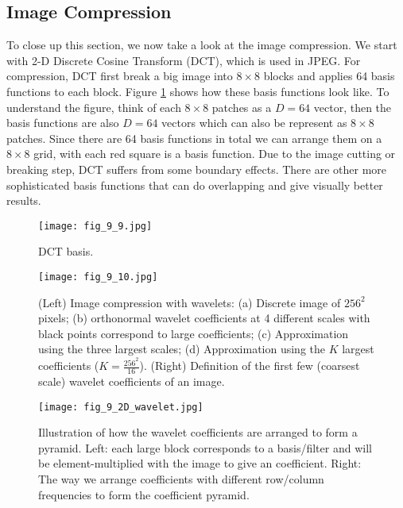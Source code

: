 \documentclass[../book-template.tex]{subfiles}
\begin{document}
\subsection{Image Compression}
To close up this section, we now take a look at the image compression. We start with 2-D Discrete Cosine Transform (DCT), which is used in JPEG. For compression, DCT first break a big image into $8\times 8$ blocks and applies 64 basis functions to each block. Figure \ref{fig_9_9} shows how these basis functions look like. To understand the figure, think of each $8\times 8$ patches as a $D=64$ vector, then the basis functions are also $D=64$ vectors which can also be represent as $8\times 8$ patches. Since there are 64 basis functions in total we can arrange them on a $8\times 8$ grid, with each red square is a basis function. Due to the image cutting or breaking step, DCT suffers from some boundary effects. There are other more sophisticated basis functions that can do overlapping and give visually better results.
\begin{figure}[h] 
	\centering 
	\texttt{[image: fig\_9\_9.jpg]} 
	\caption{DCT basis.}\label{fig_9_9}
\end{figure}
\begin{figure}[h] 
	\centering 
	\texttt{[image: fig\_9\_10.jpg]} 
	\caption{(Left) Image compression with wavelets: (a) Discrete image of $256^2$ pixels; (b) orthonormal wavelet coefficients at 4 different scales with black points correspond to large coefficients; (c) Approximation using the three largest scales; (d) Approximation using the $K$ largest coefficients ($K=\frac{256^2}{16}$). (Right) Definition of the first few (coarsest scale) wavelet coefficients of an image.}\label{fig_9_10}
\end{figure}
\begin{figure}[h] 
	\centering 
	\texttt{[image: fig\_9\_2D\_wavelet.jpg]} 
	\caption{Illustration of how the wavelet coefficients are arranged to form a pyramid. Left: each large block corresponds to a basis/filter and will be element-multiplied with the image to give an coefficient. Right: The way we arrange coefficients with different row/column frequencies to form the coefficient pyramid.}\label{fig_9_2D_wavelet}
\end{figure}
\end{document}
